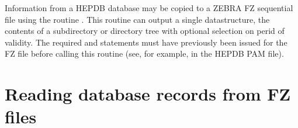 Information from a HEPDB database may be copied to a ZEBRA FZ sequential
file using the routine . This routine can output a single
datastructure, the contents of a subdirectory or directory tree with optional
selection on perid of validity.
The required  and  statements must have
previously been issued for the FZ file before calling this routine
(see, for example,  in the HEPDB PAM file).


\newpage
{}
\section{Reading database records from FZ files}



